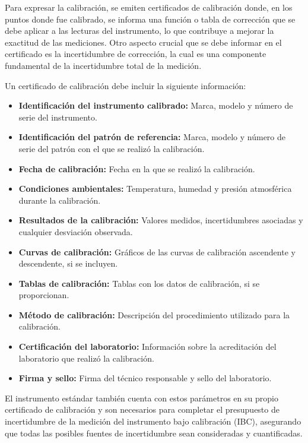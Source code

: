Para expresar la calibración, se emiten certificados de calibración donde, en los puntos donde fue calibrado, se informa una función o tabla de corrección que se debe aplicar a las lecturas del instrumento, lo que contribuye a mejorar la exactitud de las mediciones. Otro aspecto crucial que se debe informar en el certificado es la incertidumbre de corrección, la cual es una componente fundamental de la incertidumbre total de la medición.

Un certificado de calibración debe incluir la siguiente información:

\begin{itemize}
    \item \textbf{Identificación del instrumento calibrado:} Marca, modelo y número de serie del instrumento.
    \item \textbf{Identificación del patrón de referencia:} Marca, modelo y número de serie del patrón con el que se realizó la calibración.
    \item \textbf{Fecha de calibración:} Fecha en la que se realizó la calibración.
    \item \textbf{Condiciones ambientales:} Temperatura, humedad y presión atmosférica durante la calibración.
    \item \textbf{Resultados de la calibración:} Valores medidos, incertidumbres asociadas y cualquier desviación observada.
    \item \textbf{Curvas de calibración:} Gráficos de las curvas de calibración ascendente y descendente, si se incluyen.
    \item \textbf{Tablas de calibración:} Tablas con los datos de calibración, si se proporcionan.
    \item \textbf{Método de calibración:} Descripción del procedimiento utilizado para la calibración.
    \item \textbf{Certificación del laboratorio:} Información sobre la acreditación del laboratorio que realizó la calibración.
    \item \textbf{Firma y sello:} Firma del técnico responsable y sello del laboratorio.
\end{itemize}

El instrumento estándar también cuenta con estos parámetros en su propio certificado de calibración y son necesarios para completar el presupuesto de incertidumbre de la medición del instrumento bajo calibración (IBC), asegurando que todas las posibles fuentes de incertidumbre sean consideradas y cuantificadas.

